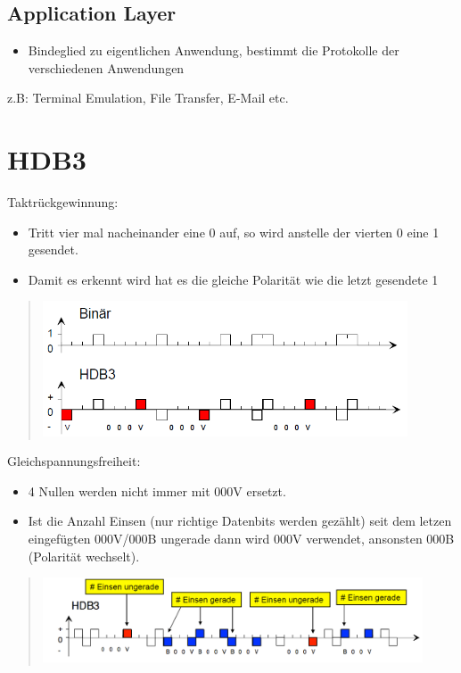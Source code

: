 \subsection*{Application Layer}
\begin{itemize}
\item Bindeglied zu eigentlichen Anwendung, bestimmt die Protokolle der
verschiedenen Anwendungen
\end{itemize}
z.B: Terminal Emulation, File Transfer, E-Mail etc.


\section*{HDB3}

Taktrückgewinnung:
\begin{itemize}
\item Tritt vier mal nacheinander eine 0 auf, so wird anstelle der vierten
0 eine 1 gesendet.
\item Damit es erkennt wird hat es die gleiche Polarität wie die letzt gesendete
1\end{itemize}
\begin{verse}
\includegraphics[height=4cm]{part1/HDB3_1}
\end{verse}
Gleichspannungsfreiheit:
\begin{itemize}
\item 4 Nullen werden nicht immer mit 000V ersetzt.
\item Ist die Anzahl Einsen (nur richtige Datenbits werden gezählt) seit
dem letzen eingefügten 000V/000B ungerade dann wird 000V verwendet,
ansonsten 000B (Polarität wechselt).\end{itemize}
\begin{verse}
\includegraphics[height=2.5cm]{part1/HDB3_2}
\end{verse}

